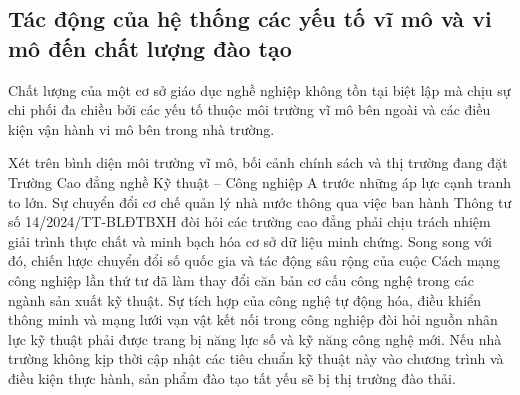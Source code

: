 \subsection{Tác động của hệ thống các yếu tố vĩ mô và vi mô đến chất lượng đào tạo}

Chất lượng của một cơ sở giáo dục nghề nghiệp không tồn tại biệt lập mà chịu sự chi phối đa chiều bởi các yếu tố thuộc môi trường vĩ mô bên ngoài và các điều kiện vận hành vi mô bên trong nhà trường.

Xét trên bình diện môi trường vĩ mô, bối cảnh chính sách và thị trường đang đặt Trường Cao đẳng nghề Kỹ thuật -- Công nghiệp A trước những áp lực cạnh tranh to lớn. Sự chuyển đổi cơ chế quản lý nhà nước thông qua việc ban hành Thông tư số 14/2024/TT-BLĐTBXH đòi hỏi các trường cao đẳng phải chịu trách nhiệm giải trình thực chất và minh bạch hóa cơ sở dữ liệu minh chứng. Song song với đó, chiến lược chuyển đổi số quốc gia và tác động sâu rộng của cuộc Cách mạng công nghiệp lần thứ tư đã làm thay đổi căn bản cơ cấu công nghệ trong các ngành sản xuất kỹ thuật. Sự tích hợp của công nghệ tự động hóa, điều khiển thông minh và mạng lưới vạn vật kết nối trong công nghiệp đòi hỏi nguồn nhân lực kỹ thuật phải được trang bị năng lực số và kỹ năng công nghệ mới. Nếu nhà trường không kịp thời cập nhật các tiêu chuẩn kỹ thuật này vào chương trình và điều kiện thực hành, sản phẩm đào tạo tất yếu sẽ bị thị trường đào thải.

